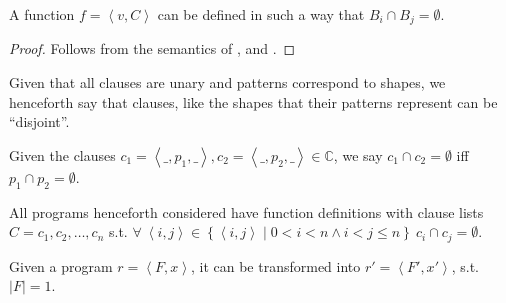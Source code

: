 \begin{theorem} A function $f = \left\langle v, C \right\rangle$ can be defined
in such a way that $B_i\cap B_j=\emptyset$.\end{theorem}

\begin{proof} Follows from the semantics of \D{},
 and . \end{proof}

Given that all clauses are unary and patterns correspond to shapes, we
henceforth say that clauses, like the shapes that their patterns represent can
be ``disjoint''.

\begin{definition} Given the clauses $c_1 = \left\langle \_, p_1, \_
\right\rangle, c_2 = \left\langle \_, p_2, \_ \right\rangle\in \mathbb{C} $, we
say $c_1\cap c_2 = \emptyset$ iff $p_1\cap p_2 = \emptyset$.\end{definition}

\begin{definition}\label{definition:nice-3} All programs henceforth considered
have function definitions with clause lists $C=c_1,c_2,\ldots,c_n$ s.t.
$\forall\ \left\langle i,j \right\rangle \in \left\{ \left\langle i, j
\right\rangle \mid 0 < i < n \wedge i < j \leq n \right\}\ c_i \cap c_j =
\emptyset $.\end{definition}

\begin{lemma}\label{lemma:program-many-to-one} Given a program $r =
\left\langle F, x\right\rangle$, it can be transformed into $r'=\left\langle
F',x' \right\rangle$, s.t. $|F|=1$.\end{lemma}

